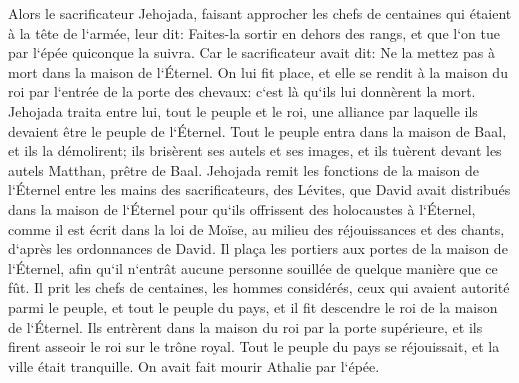 \verse Alors le sacrificateur Jehojada, faisant approcher les chefs de centaines qui étaient à la tête de l`armée, leur dit: Faites-la sortir en dehors des rangs, et que l`on tue par l`épée quiconque la suivra. Car le sacrificateur avait dit: Ne la mettez pas à mort dans la maison de l`Éternel. 
\verse On lui fit place, et elle se rendit à la maison du roi par l`entrée de la porte des chevaux: c`est là qu`ils lui donnèrent la mort. 
\verse Jehojada traita entre lui, tout le peuple et le roi, une alliance par laquelle ils devaient être le peuple de l`Éternel. 
\verse Tout le peuple entra dans la maison de Baal, et ils la démolirent; ils brisèrent ses autels et ses images, et ils tuèrent devant les autels Matthan, prêtre de Baal. 
\verse Jehojada remit les fonctions de la maison de l`Éternel entre les mains des sacrificateurs, des Lévites, que David avait distribués dans la maison de l`Éternel pour qu`ils offrissent des holocaustes à l`Éternel, comme il est écrit dans la loi de Moïse, au milieu des réjouissances et des chants, d`après les ordonnances de David. 
\verse Il plaça les portiers aux portes de la maison de l`Éternel, afin qu`il n`entrât aucune personne souillée de quelque manière que ce fût. 
\verse Il prit les chefs de centaines, les hommes considérés, ceux qui avaient autorité parmi le peuple, et tout le peuple du pays, et il fit descendre le roi de la maison de l`Éternel. Ils entrèrent dans la maison du roi par la porte supérieure, et ils firent asseoir le roi sur le trône royal. 
\verse Tout le peuple du pays se réjouissait, et la ville était tranquille. On avait fait mourir Athalie par l`épée. 

